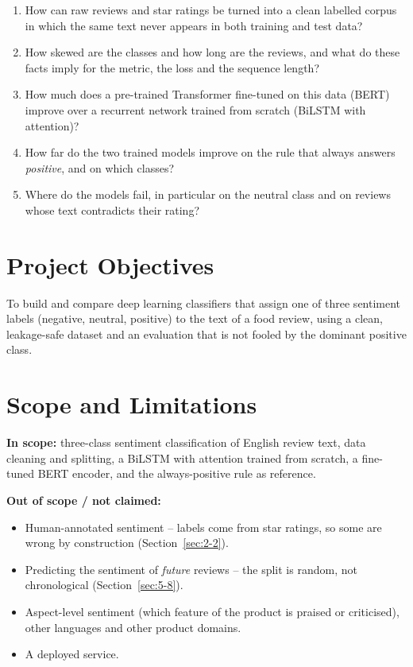 \begin{enumerate}
    \item How can raw reviews and star ratings be turned into a clean labelled corpus in which the same text never appears in both training and test data?
    \item How skewed are the classes and how long are the reviews, and what do these facts imply for the metric, the loss and the sequence length?
    \item How much does a pre-trained Transformer fine-tuned on this data (BERT) improve over a recurrent network trained from scratch (BiLSTM with attention)?
    \item How far do the two trained models improve on the rule that always answers \emph{positive}, and on which classes?
    \item Where do the models fail, in particular on the neutral class and on reviews whose text contradicts their rating?
\end{enumerate}

\section{Project Objectives}
\label{sec:1-4}

To build and compare deep learning classifiers that assign one of three sentiment labels (negative, neutral, positive) to the text of a food review, using a clean, leakage-safe dataset and an evaluation that is not fooled by the dominant positive class.

\section{Scope and Limitations}
\label{sec:1-5}

\textbf{In scope:} three-class sentiment classification of English review text, data cleaning and splitting, a BiLSTM with attention trained from scratch, a fine-tuned BERT encoder, and the always-positive rule as reference.

\textbf{Out of scope / not claimed:}
\begin{itemize}
    \item Human-annotated sentiment -- labels come from star ratings, so some are wrong by construction (Section~\ref{sec:2-2}).
    \item Predicting the sentiment of \emph{future} reviews -- the split is random, not chronological (Section~\ref{sec:5-8}).
    \item Aspect-level sentiment (which feature of the product is praised or criticised), other languages and other product domains.
    \item A deployed service.
\end{itemize}

